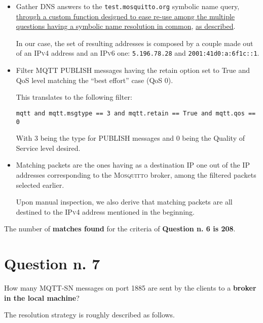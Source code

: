 \documentclass[a4paper,11pt]{article} %
\begin{document}
    \begin{itemize}
        \item Gather \textsc{DNS} answers to the \texttt{test.mosquitto.org} symbolic name query, \hyperref[subsubsec:dns-resolution-python]{through a custom function designed to ease re-use among the multiple questions having a symbolic name resolution in common}, \hyperref[sec:question-n.-2]{as described}.

        In our case, the set of resulting addresses is composed by a couple made out of an \textsc{IPv4} address and an \textsc{IPv6} one: \texttt{5.196.78.28} and \texttt{2001:41d0:a:6f1c::1}.
        \item Filter \textsc{MQTT PUBLISH} messages having the retain option set to True and QoS level matching the “best effort” case (QoS 0).

        This translates to the following filter:

        \texttt{mqtt and mqtt.msgtype == 3 and mqtt.retain == True and mqtt.qos == 0}

        With 3 being the type for \textsc{PUBLISH} messages and 0 being the Quality of Service level desired.
        \item Matching packets are the ones having as a destination IP one out of the IP addresses corresponding to the \textsc{Mosquitto} broker, among the filtered packets selected earlier.

        Upon manual inspection, we also derive that matching packets are all destined to the \textsc{IPv4} address mentioned in the beginning.
    \end{itemize}

    The number of \textbf{matches found} for the criteria of \textbf{Question n. 6 is 208}.


    \section{Question n. 7}\label{sec:question-n.-7}

    How many MQTT-SN messages on port 1885 are sent by the clients to a \textbf{broker in the local machine}?

    \medskip

    The resolution strategy is roughly described as follows.
\end{document}
